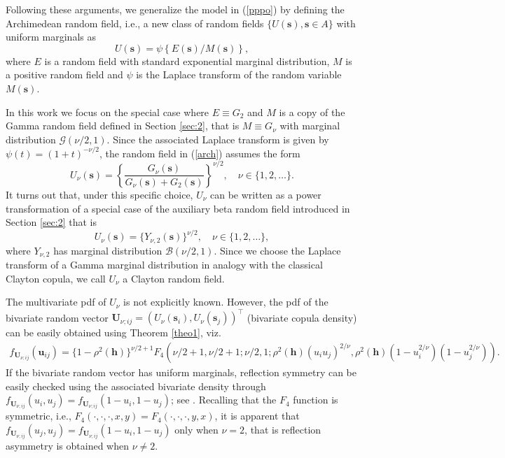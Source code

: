 \documentclass[times,sort&compress,3p]{elsarticle}
\theoremstyle{plain}%
\theoremstyle{definition}
\def\ss{\bm{s}}
\def\uu{\bm{u}}
\def\UU{\bm{U}}
\def\hh{\bm{h}}
\begin{document}
Following these arguments, we generalize the model in (\ref{pppo}) by defining  the Archimedean random field, i.e., a new class of random fields $\{U(\ss), \ss \in A\}$ with uniform marginals as
\begin{equation}\label{arch}
U(\ss)=\psi\left\{ E(\ss)/M(\ss) \right\},
\end{equation}
where $E$ is a random field with standard exponential marginal distribution, $M$ is a positive random field  and $\psi$ is the  Laplace transform of the random variable $M(\ss)$.

In this work we focus on the special case where  $ E \equiv G_{2}$ and $M$ is a copy of the Gamma random field  defined in Section \ref{sec:2}, that is $M \equiv G_{\nu}$ with marginal distribution $\mathcal{G}(\nu/2,1)$. Since the associated Laplace transform is given by $\psi(t)=(1+t)^{-\nu/2}$, the random field  in (\ref{arch}) assumes the form
\begin{equation*}\label{clayton}
U_{\nu}(\ss)=\left\{\frac{G_{\nu}(\ss)}{G_{\nu}(\ss)+G_{2}(\ss)}\right\}^{\nu/2}, \quad \nu\in\{1,2,\ldots\}.
\end{equation*}
It turns out that, under this specific choice, $U_{\nu}$ can be written as a power transformation of a special case of the auxiliary beta random field introduced in Section \ref{sec:2} that is
\begin{equation*}\label{clayton3}
U_{\nu}(\ss) =\{Y_{\nu,2}(\ss)\}^{\nu/2}, \quad \nu\in\{1,2,\ldots\},
\end{equation*}
where $Y_{\nu,2}$ has  marginal distribution $\mathcal{B}(\nu/2,1)$.
Since we choose the Laplace transform of a  Gamma marginal distribution in analogy with the classical Clayton copula,
we call  $U_{\nu}$ a Clayton  random field.

The multivariate pdf  of $U_{\nu}$ is not explicitly known.  However, the pdf  of the bivariate random vector  $\UU_{\nu;ij}=(U_{\nu}(\ss_i), U_{\nu}(\ss_j))^\top$ (bivariate copula density) can be easily obtained using Theorem \ref{theo1}, viz.
\begin{align}\label{pairbU}
f_{\UU_{\nu;ij}}(\uu_{ij})=
\{1-\rho^2(\hh)\}^{\nu/2+1}
F_4\left(\nu/2 +1,\nu/2+1;\nu/2,1;\rho^2(\hh)(u_iu_j)^{2/\nu},\rho^2(\hh)(1-u^{2/\nu}_i)(1-u^{2/\nu}_j)\right).
\end{align}
If the bivariate random vector has uniform marginals, reflection symmetry can be easily  checked
using  the associated bivariate density through $f_{\UU_{\nu;ij}}(u_i,u_j)=f_{\UU_{\nu;ij}}(1-u_i,1-u_j)$; see \citep{Joe:2014}.
Recalling that the $F_4$  function is symmetric, i.e., $F_4(\cdot,\cdot,\cdot,x,y)=F_4(\cdot,\cdot,\cdot,y,x)$,
it is apparent that  $f_{\UU_{\nu;ij}}(u_{j},u_{j})=f_{\bm{U}_{\nu;ij}}(1-u_{i},1-u_{j} )$  only when $\nu=2$, that is reflection asymmetry is obtained when  $\nu\neq 2$.
\end{document}
